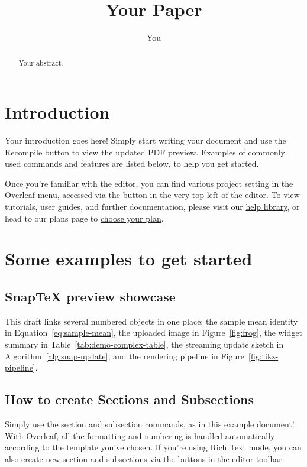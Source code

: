 \documentclass{article}
\title{Your Paper}
\author{You}
\begin{document}
\maketitle

\begin{abstract}
Your abstract.
\end{abstract}

\section{Introduction}

Your introduction goes here! Simply start writing your document and use the Recompile button to view the updated PDF preview. Examples of commonly used commands and features are listed below, to help you get started.

Once you're familiar with the editor, you can find various project setting in the Overleaf menu, accessed via the button in the very top left of the editor. To view tutorials, user guides, and further documentation, please visit our \href{https://www.overleaf.com/learn}{help library}, or head to our plans page to \href{https://www.overleaf.com/user/subscription/plans}{choose your plan}.


\section{Some examples to get started}

\subsection{SnapTeX preview showcase}

This draft links several numbered objects in one place: the sample mean identity in Equation~\eqref{eq:sample-mean}, the uploaded image in Figure~\ref{fig:frog}, the widget summary in Table~\ref{tab:demo-complex-table}, the streaming update sketch in Algorithm~\ref{alg:snap-update}, and the rendering pipeline in Figure~\ref{fig:tikz-pipeline}.



\subsection{How to create Sections and Subsections}

Simply use the section and subsection commands, as in this example document! With Overleaf, all the formatting and numbering is handled automatically according to the template you've chosen. If you're using Rich Text mode, you can also create new section and subsections via the buttons in the editor toolbar.
\end{document}
